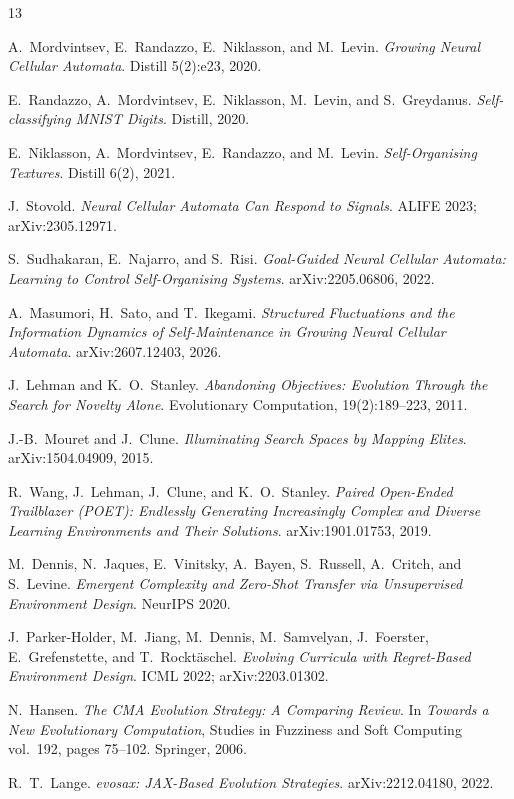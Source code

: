 \documentclass{article}
\begin{document}
\clearpage
\begin{thebibliography}{13}

A.~Mordvintsev, E.~Randazzo, E.~Niklasson, and M.~Levin.
\emph{Growing Neural Cellular Automata}.
Distill 5(2):e23, 2020.

E.~Randazzo, A.~Mordvintsev, E.~Niklasson, M.~Levin, and S.~Greydanus.
\emph{Self-classifying MNIST Digits}.
Distill, 2020.

E.~Niklasson, A.~Mordvintsev, E.~Randazzo, and M.~Levin.
\emph{Self-Organising Textures}.
Distill 6(2), 2021.

J.~Stovold.
\emph{Neural Cellular Automata Can Respond to Signals}.
ALIFE 2023; arXiv:2305.12971.

S.~Sudhakaran, E.~Najarro, and S.~Risi.
\emph{Goal-Guided Neural Cellular Automata: Learning to Control Self-Organising Systems}.
arXiv:2205.06806, 2022.

A.~Masumori, H.~Sato, and T.~Ikegami.
\emph{Structured Fluctuations and the Information Dynamics of Self-Maintenance in Growing Neural Cellular Automata}.
arXiv:2607.12403, 2026.

J.~Lehman and K.~O.~Stanley.
\emph{Abandoning Objectives: Evolution Through the Search for Novelty Alone}.
Evolutionary Computation, 19(2):189--223, 2011.

J.-B.~Mouret and J.~Clune.
\emph{Illuminating Search Spaces by Mapping Elites}.
arXiv:1504.04909, 2015.

R.~Wang, J.~Lehman, J.~Clune, and K.~O.~Stanley.
\emph{Paired Open-Ended Trailblazer (POET): Endlessly Generating Increasingly Complex and Diverse Learning Environments and Their Solutions}.
arXiv:1901.01753, 2019.

M.~Dennis, N.~Jaques, E.~Vinitsky, A.~Bayen, S.~Russell, A.~Critch, and S.~Levine.
\emph{Emergent Complexity and Zero-Shot Transfer via Unsupervised Environment Design}.
NeurIPS 2020.

J.~Parker-Holder, M.~Jiang, M.~Dennis, M.~Samvelyan, J.~Foerster,
E.~Grefenstette, and T.~Rockt\"aschel.
\emph{Evolving Curricula with Regret-Based Environment Design}.
ICML 2022; arXiv:2203.01302.

N.~Hansen.
\emph{The CMA Evolution Strategy: A Comparing Review}.
In \emph{Towards a New Evolutionary Computation}, Studies in Fuzziness and
Soft Computing vol.~192, pages 75--102. Springer, 2006.

R.~T.~Lange.
\emph{evosax: JAX-Based Evolution Strategies}.
arXiv:2212.04180, 2022.

\end{thebibliography}
\end{document}
